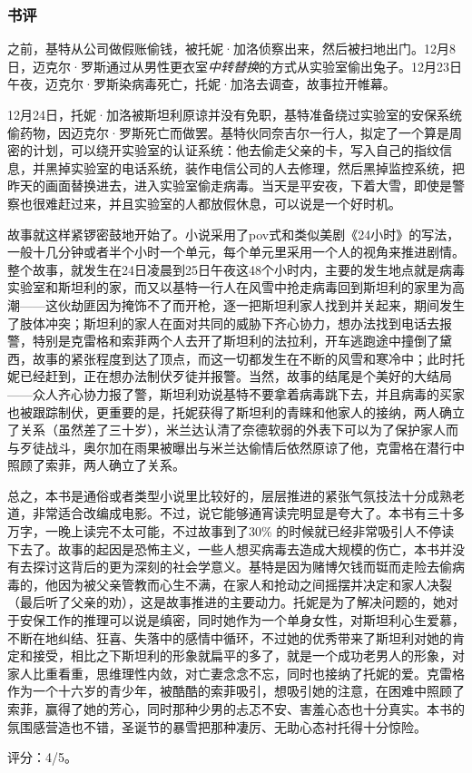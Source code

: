 \subsubsection{书评}
之前，基特从公司做假账偷钱，被托妮·加洛侦察出来，然后被扫地出门。12月8日，迈克尔·罗斯通过从男性更衣室\emph{中转替换}的方式从实验室偷出兔子。12月23日午夜，迈克尔·罗斯染病毒死亡，托妮·加洛去调查，故事拉开帷幕。

12月24日，托妮·加洛被斯坦利原谅并没有免职，基特准备绕过实验室的安保系统偷药物，因迈克尔·罗斯死亡而做罢。基特伙同奈吉尔一行人，拟定了一个算是周密的计划，可以绕开实验室的认证系统：他去偷走父亲的卡，写入自己的指纹信息，并黑掉实验室的电话系统，装作电信公司的人去修理，然后黑掉监控系统，把昨天的画面替换进去，进入实验室偷走病毒。当天是平安夜，下着大雪，即使是警察也很难赶过来，并且实验室的人都放假休息，可以说是一个好时机。

故事就这样紧锣密鼓地开始了。小说采用了pov式和类似美剧《24小时》的写法，一般十几分钟或者半个小时一个单元，每个单元里采用一个人的视角来推进剧情。整个故事，就发生在24日凌晨到25日午夜这48个小时内，主要的发生地点就是病毒实验室和斯坦利的家，而又以基特一行人在风雪中抢走病毒回到斯坦利的家里为高潮——这伙劫匪因为掩饰不了而开枪，逐一把斯坦利家人找到并关起来，期间发生了肢体冲突；斯坦利的家人在面对共同的威胁下齐心协力，想办法找到电话去报警，特别是克雷格和索菲两个人去开了斯坦利的法拉利，开车逃跑途中撞倒了黛西，故事的紧张程度到达了顶点，而这一切都发生在不断的风雪和寒冷中；此时托妮已经赶到，正在想办法制伏歹徒并报警。当然，故事的结尾是个美好的大结局——众人齐心协力报了警，斯坦利劝说基特不要拿着病毒跳下去，并且病毒的买家也被跟踪制伏，更重要的是，托妮获得了斯坦利的青睐和他家人的接纳，两人确立了关系（虽然差了三十岁），米兰达认清了奈德软弱的外表下可以为了保护家人而与歹徒战斗，奥尔加在雨果被曝出与米兰达偷情后依然原谅了他，克雷格在潜行中照顾了索菲，两人确立了关系。

总之，本书是通俗或者类型小说里比较好的，层层推进的紧张气氛技法十分成熟老道，非常适合改编成电影。不过，说它能够通宵读完明显是夸大了。本书有三十多万字，一晚上读完不太可能，不过故事到了30\% 的时候就已经非常吸引人不停读下去了。故事的起因是恐怖主义，一些人想买病毒去造成大规模的伤亡，本书并没有去探讨这背后的更为深刻的社会学意义。基特是因为赌博欠钱而铤而走险去偷病毒的，他因为被父亲管教而心生不满，在家人和抢动之间摇摆并决定和家人决裂（最后听了父亲的劝），这是故事推进的主要动力。托妮是为了解决问题的，她对于安保工作的推理可以说是缜密，同时她作为一个单身女性，对斯坦利心生爱慕，不断在地纠结、狂喜、失落中的感情中循环，不过她的优秀带来了斯坦利对她的肯定和接受，相比之下斯坦利的形象就扁平的多了，就是一个成功老男人的形象，对家人比重看重，思维理性内敛，对亡妻念念不忘，同时也接纳了托妮的爱。克雷格作为一个十六岁的青少年，被酷酷的索菲吸引，想吸引她的注意，在困难中照顾了索菲，赢得了她的芳心，同时那种少男的忐忑不安、害羞心态也十分真实。本书的氛围感营造也不错，圣诞节的暴雪把那种凄厉、无助心态衬托得十分惊险。

评分：4/5。